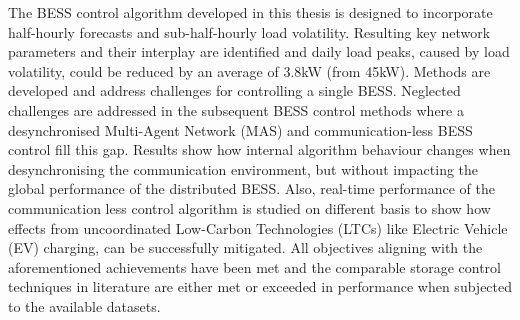 The BESS control algorithm developed in this thesis is designed to incorporate half-hourly forecasts and sub-half-hourly load volatility.
Resulting key network parameters and their interplay are identified and daily load peaks, caused by load volatility, could be reduced by an average of 3.8kW (from 45kW).
Methods are developed and address challenges for controlling a single BESS.
Neglected challenges are addressed in the subsequent BESS control methods where a desynchronised Multi-Agent Network (MAS) and communication-less BESS control fill this gap.
Results show how internal algorithm behaviour changes when desynchronising the communication environment, but without impacting the global performance of the distributed BESS.
Also, real-time performance of the communication less control algorithm is studied on different basis to show how effects from uncoordinated Low-Carbon Technologies (LTCs) like Electric Vehicle (EV) charging, can be successfully mitigated.
All objectives aligning with the aforementioned achievements have been met and the comparable storage control techniques in literature are either met or exceeded in performance when subjected to the available datasets.
 